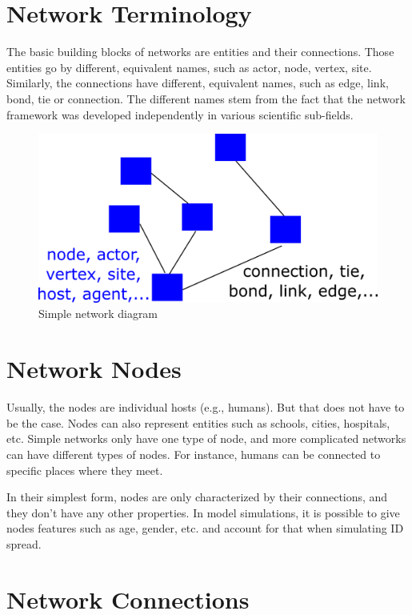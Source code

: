 \documentclass[]{book}
\theoremstyle{definition}
\theoremstyle{definition}
\theoremstyle{definition}
\theoremstyle{remark}
\begin{document}
\section{Network Terminology}\label{network-terminology}

The basic building blocks of networks are entities and their
connections. Those entities go by different, equivalent names, such as
actor, node, vertex, site. Similarly, the connections have different,
equivalent names, such as edge, link, bond, tie or connection. The
different names stem from the fact that the network framework was
developed independently in various scientific sub-fields.

\begin{figure}
\centering
\includegraphics{./images/network-diagram.png}
\caption{Simple network diagram}
\end{figure}

\section{Network Nodes}\label{network-nodes}

Usually, the nodes are individual hosts (e.g., humans). But that does
not have to be the case. Nodes can also represent entities such as
schools, cities, hospitals, etc. Simple networks only have one type of
node, and more complicated networks can have different types of nodes.
For instance, humans can be connected to specific places where they
meet.

In their simplest form, nodes are only characterized by their
connections, and they don't have any other properties. In model
simulations, it is possible to give nodes features such as age, gender,
etc. and account for that when simulating ID spread.

\section{Network Connections}\label{network-connections}
\end{document}
